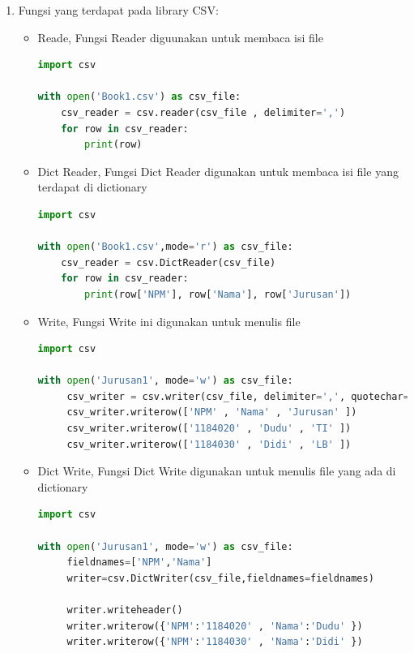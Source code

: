 \begin{enumerate}
	\item Fungsi yang terdapat pada library CSV:\\
	\begin{itemize}
	\item Reade, Fungsi Reader diguunakan untuk membaca  isi file
	\begin{lstlisting}[language=Python]
import csv

with open('Book1.csv') as csv_file:
    csv_reader = csv.reader(csv_file , delimiter=',')
    for row in csv_reader:
        print(row)
\end{lstlisting}
	\end{itemize}
	\begin{itemize}
	\item Dict Reader, Fungsi Dict Reader digunakan untuk membaca isi file yang terdapat di dictionary
	\begin{lstlisting}[language=Python]
import csv

with open('Book1.csv',mode='r') as csv_file:
    csv_reader = csv.DictReader(csv_file)
    for row in csv_reader:
        print(row['NPM'], row['Nama'], row['Jurusan'])
\end{lstlisting}
	\end{itemize}
	\begin{itemize}
	\item Write, Fungsi Write ini digunakan untuk menulis file
	\begin{lstlisting}[language=Python]
import csv

with open('Jurusan1', mode='w') as csv_file:
     csv_writer = csv.writer(csv_file, delimiter=',', quotechar='"', quoting=csv.QUOTE_MINIMAL) 
     csv_writer.writerow(['NPM' , 'Nama' , 'Jurusan' ])
     csv_writer.writerow(['1184020' , 'Dudu' , 'TI' ])
     csv_writer.writerow(['1184030' , 'Didi' , 'LB' ])
\end{lstlisting}
	\end{itemize}
	\begin{itemize}
	\item Dict Write, Fungsi Dict Write digunakan untuk menulis file yang ada di dictionary
	\begin{lstlisting}[language=Python]
import csv

with open('Jurusan1', mode='w') as csv_file:
     fieldnames=['NPM','Nama']
     writer=csv.DictWriter(csv_file,fieldnames=fieldnames)

     writer.writeheader()
     writer.writerow({'NPM':'1184020' , 'Nama':'Dudu' })
     writer.writerow({'NPM':'1184030' , 'Nama':'Didi' })
\end{lstlisting}
	\end{itemize}
	

\end{enumerate}

